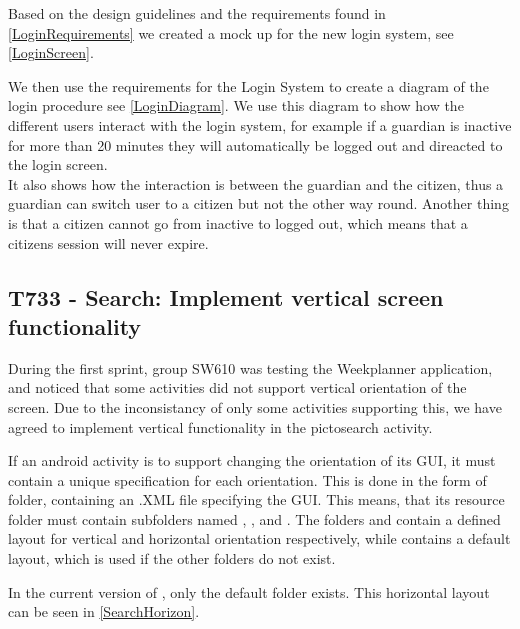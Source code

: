 Based on the design guidelines and the requirements found in
\autoref{LoginRequirements} we created a mock up for the new login system, see
\autoref{LoginScreen}.


We then use the requirements for the Login System to create a diagram of the
login procedure see \autoref{LoginDiagram}. We use this diagram to show how the
different users interact with the login system, for example if a guardian is inactive for
more than 20 minutes they will automatically be logged out and direacted to the
login screen.\\
It also shows how the interaction is between the guardian and the citizen, thus a
guardian can switch user to a citizen but not the other way round. Another thing
is that a citizen cannot go from inactive to logged out, which means that a
citizens session will never expire.


\subsection{T733 - Search: Implement vertical screen functionality}
During the first sprint, group SW610 was testing the Weekplanner application,
and noticed that some activities did not support vertical orientation of the
screen. Due to the inconsistancy of only some activities supporting this, we
have agreed to implement vertical functionality in the pictosearch activity.\nl

If an android activity is to support changing the orientation of its GUI, it
must contain a unique specification for each orientation. This is done in the
form of folder, containing an .XML file specifying the GUI. This means, that its
resource folder  must contain subfolders named ,
, and . The folders 
and  contain a defined layout for vertical and horizontal
orientation respectively, while  contains a default layout, which
is used if the other folders do not exist.\nl

In the current version of , only the default folder
 exists. This horizontal layout can be seen in
\autoref{SearchHorizon}.

    
